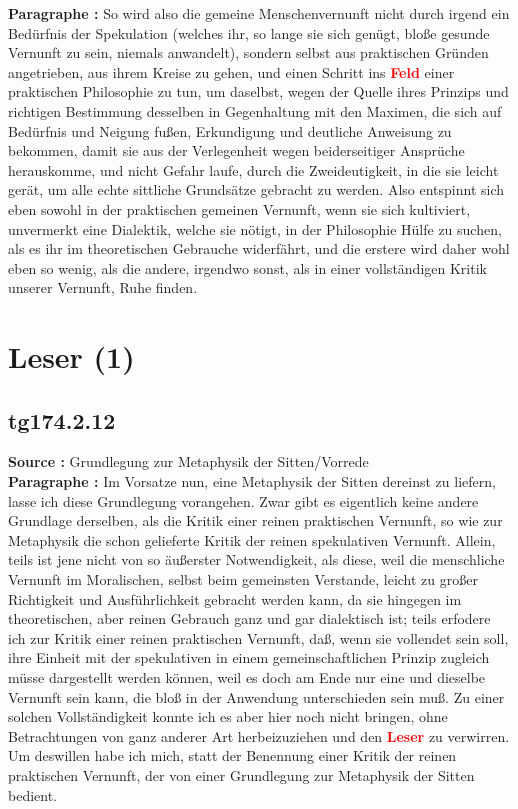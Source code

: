 \documentclass[a4paper,12pt,twoside]{book}
\newcommand{\match}[1]{\textcolor{red}{\textbf{#1}}}
\newcommand{\unnumberedsection}[1]{
	\section*{#1}
	\addcontentsline{toc}{section}{#1}
	\markright{#1}
}
\begin{document}
	\noindent\textbf{Paragraphe : }So wird also die gemeine Menschenvernunft nicht durch irgend ein Bedürfnis der Spekulation (welches ihr, so lange sie sich genügt, bloße gesunde Vernunft zu sein, niemals anwandelt), sondern selbst aus praktischen Gründen  angetrieben, aus ihrem Kreise zu gehen, und einen Schritt ins \match{Feld} einer praktischen Philosophie zu tun, um daselbst, wegen der Quelle ihres Prinzips und richtigen Bestimmung desselben in Gegenhaltung mit den Maximen, die sich auf Bedürfnis und Neigung fußen, Erkundigung und deutliche Anweisung zu bekommen, damit sie aus der Verlegenheit wegen beiderseitiger Ansprüche herauskomme, und nicht Gefahr laufe, durch die Zweideutigkeit, in die sie leicht gerät, um alle echte sittliche Grundsätze gebracht zu werden. Also entspinnt sich eben sowohl in der praktischen gemeinen Vernunft, wenn sie sich kultiviert, unvermerkt eine Dialektik, welche sie nötigt, in der Philosophie Hülfe zu suchen, als es ihr im theoretischen Gebrauche widerfährt, und die erstere wird daher wohl eben so wenig, als die andere, irgendwo sonst, als in einer vollständigen Kritik unserer Vernunft, Ruhe finden. 
	
	\unnumberedsection{Leser (1)} 
	\subsection*{tg174.2.12} 
	\textbf{Source : }Grundlegung zur Metaphysik der Sitten/Vorrede\\  
	
	\noindent\textbf{Paragraphe : }Im Vorsatze nun, eine Metaphysik der Sitten dereinst zu liefern, lasse ich diese Grundlegung vorangehen. Zwar gibt  es eigentlich keine andere Grundlage derselben, als die Kritik einer reinen praktischen Vernunft, so wie zur Metaphysik die schon gelieferte Kritik der reinen spekulativen Vernunft. Allein, teils ist jene nicht von so äußerster Notwendigkeit, als diese, weil die menschliche Vernunft im Moralischen, selbst beim gemeinsten Verstande, leicht zu großer Richtigkeit und Ausführlichkeit gebracht werden kann, da sie hingegen im theoretischen, aber reinen Gebrauch ganz und gar dialektisch ist; teils erfodere ich zur Kritik einer reinen praktischen Vernunft, daß, wenn sie vollendet sein soll, ihre Einheit mit der spekulativen in einem gemeinschaftlichen Prinzip zugleich müsse dargestellt werden können, weil es doch am Ende nur eine und dieselbe Vernunft sein kann, die bloß in der Anwendung unterschieden sein muß. Zu einer solchen Vollständigkeit konnte ich es aber hier noch nicht bringen, ohne Betrachtungen von ganz anderer Art herbeizuziehen und den \match{Leser} zu verwirren. Um deswillen habe ich mich, statt der Benennung einer Kritik der reinen praktischen Vernunft, der von einer Grundlegung zur Metaphysik der Sitten bedient. 
	
\end{document}
